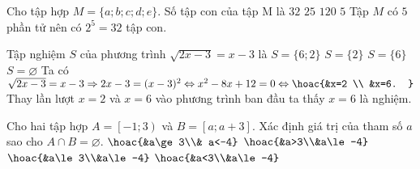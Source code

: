 \begin{ex}%
    Cho tập hợp $M=\{a ; b ; c ; d ; e\}$. Số tập con của tập $\mathrm{M}$ là
    \choice
    {\True $32$}
    {$25$}
    {$120$}
    {$5$} 
    \loigiai
    {
        Tập $M$ có $5$ phần tử nên có $2^5=32$ tập con.
    }
\end{ex}
\begin{ex}%
    Tập nghiệm $S$ của phương trình $\sqrt{2 x-3}=x-3$ là
    \choice
    {$S=\{6 ; 2\}$}
    {$S=\{2\}$}
    {\True $S=\{6\}$}
    {$S=\varnothing$} 
    \loigiai
    {
        Ta có $\sqrt{2 x-3}=x-3\Rightarrow 2x-3=(x-3)^2\Leftrightarrow x^2-8x+12=0\Leftrightarrow \hoac{&x=2  \\ &x=6. }$\\
        Thay lần lượt $x=2$ và $x=6$ vào phương trình ban đầu ta thấy $x=6$ là nghiệm.
    }
\end{ex}
\begin{ex}%
    Cho hai tập hợp $A=\left[-1;3\right)$ và $B=\left[a;a+3\right]$. Xác định giá trị của tham số $a$ sao cho $A\cap B=\varnothing$.
    \choice
    {\True $\hoac{&a\ge 3\\& a<-4}$}
    {$\hoac{&a>3\\&a\le-4}$}
    {$\hoac{&a\le 3\\&a\le -4}$}
    {$\hoac{&a<3\\&a\le-4}$}
\end{ex}
